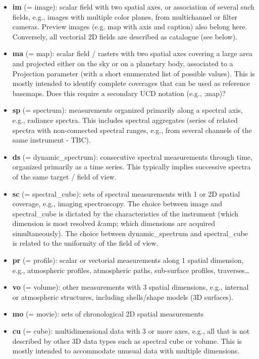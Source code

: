 \documentclass[11pt,a4paper]{ivoa}
\begin{document}
\begin{itemize}
\item \textbf{im }(= image): scalar field with two spatial axes, or association of several such fields, e.g., images with multiple color planes, from multichannel or filter cameras. Preview images (e.g. map with axis and caption) also belong here. Conversely, all vectorial 2D fields are described as catalogue (see below). \\
\item \textbf{ma }(= map): scalar field / rasters with two spatial axes covering a large area and projected either on the sky or on a planetary body, associated to a Projection parameter (with a short enumerated list of possible values). This is mostly intended to identify complete coverages that can be used as reference basemaps. Does this require a secondary UCD notation (e.g., ;map)?\\
\item \textbf{sp }(= spectrum): measurements organized primarily along a spectral axis, e.g., radiance spectra. This includes spectral aggregates (series of related spectra with non-connected spectral ranges, e.g., from several channels of the same instrument - TBC).
\item \textbf{ds }(= dynamic\_spectrum): consecutive spectral measurements through time, organized primarily as a time series. This typically implies successive spectra of the same target / field of view.
\item \textbf{sc }(= spectral\_cube): sets of spectral measurements with 1 or 2D spatial coverage, e.g., imaging spectroscopy. The choice between image and spectral\_cube is dictated by the characteristics of the instrument (which dimension is most resolved \&amp; which dimensions are acquired simultaneously). The choice between dynamic\_spectrum and spectral\_cube is related to the uniformity of the field of view.
\item \textbf{pr }(= profile): scalar or vectorial measurements along 1 spatial dimension, e.g., atmospheric profiles, atmospheric paths, sub-surface profiles, traverses…
\item \textbf{vo }(= volume): other measurements with 3 spatial dimensions, e.g., internal or atmospheric structures, including shells/shape models (3D surfaces).
\item \textbf{mo }(= movie): sets of chronological 2D spatial measurements
\item \textbf{cu }(= cube): multidimensional data with 3 or more axes, e.g., all that is not described by other 3D data types such as spectral cube or volume. This is mostly intended to accommodate unusual data with multiple dimensions.

\end{itemize}
\end{document}
